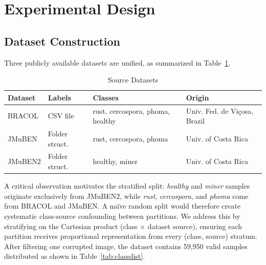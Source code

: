 \documentclass[conference]{IEEEtran}
\begin{document}
\section{Experimental Design}

\subsection{Dataset Construction}

Three publicly available datasets are unified, as summarized in
Table~\ref{tab:datasets}.

\begin{table}[htbp]
  \centering
  \caption{Source Datasets}
  \label{tab:datasets}
  \begin{tabular}{lllp{2.2cm}}
    \toprule
    \textbf{Dataset} & \textbf{Labels} & \textbf{Classes} & \textbf{Origin} \\
    \midrule
    BRACOL   & CSV file        & rust, cercospora, phoma, healthy & Univ. Fed. de Viçosa, Brazil \\
    JMuBEN   & Folder struct.  & rust, cercospora, phoma          & Univ. of Costa Rica \\
    JMuBEN2  & Folder struct.  & healthy, miner                   & Univ. of Costa Rica \\
    \bottomrule
  \end{tabular}
\end{table}

A critical observation motivates the stratified split: \textit{healthy} and
\textit{miner} samples originate exclusively from JMuBEN2, while
\textit{rust}, \textit{cercospora}, and \textit{phoma} come from BRACOL and
JMuBEN. A na\"ive random split would therefore create systematic
class-source confounding between partitions. We address this by stratifying
on the Cartesian product (class $\times$ dataset source), ensuring each
partition receives proportional representation from every (class, source)
stratum. After filtering one corrupted image, the dataset contains
59{,}950 valid samples distributed as shown in Table~\ref{tab:classdist}.
\end{document}
